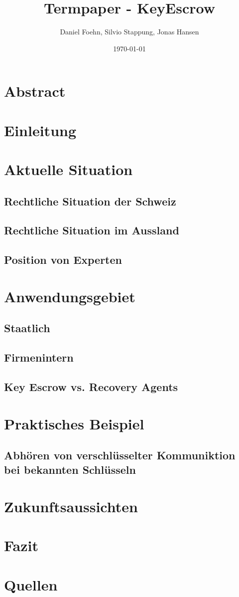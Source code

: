 \documentclass[a4paper, 10pt, fleqn]{article}
\title{Termpaper - KeyEscrow}
\author{Daniel Foehn, Silvio Stappung, Jonas Hansen}
\date{\today} %
\begin{document}
\maketitle
\tableofcontents
\listoffigures
\listoftables
\clearpage
\section{Abstract}
\clearpage
\section{Einleitung}
\clearpage
\section{Aktuelle Situation}
	\subsection{Rechtliche Situation der Schweiz}
	\subsection{Rechtliche Situation im Aussland}
	\subsection{Position von Experten}
	
\clearpage
\section{Anwendungsgebiet}
	\subsection{Staatlich}
	\subsection{Firmenintern}
	\subsection{Key Escrow vs. Recovery Agents}
\clearpage
\section{Praktisches Beispiel}
	\subsection{Abhören von verschlüsselter Kommuniktion bei bekannten Schlüsseln}
\clearpage
\section{Zukunftsaussichten}
\clearpage
\section{Fazit}
\clearpage
\section*{Quellen}
\end{document}
